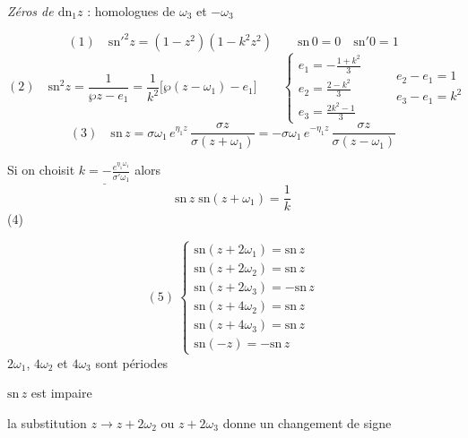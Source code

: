 \documentclass[11pt,a4paper]{article}
\begin{document}
\emph{Zéros de $\mathrm{dn}_1 z$} : homologues de $\omega_3$ et $-\omega_3$
\struck{\ill{}}

\ill{}
\[
(1)\quad \boxed{\mathrm{sn}'^2 z = (1-z^2)(1-k^2z^2)} \qquad
\mathrm{sn}\,0 = 0 \quad \mathrm{sn}'0 = 1
\]
\[
(2)\quad \boxed{\mathrm{sn}^2 z = \frac{1}{\wp z - e_1}
= \frac{1}{k^2}\bigl[\wp(z-\omega_1) - e_1\bigr]}
\qquad
\left\lbrace
\begin{array}{l}
e_1 = -\frac{1+k^2}{3}\\[4pt]
e_2 = \frac{2-k^2}{3}\\[4pt]
e_3 = \frac{2k^2-1}{3}
\end{array}
\right.
\qquad
\begin{array}{l}
e_2 - e_1 = 1\\
e_3 - e_1 = k^2
\end{array}
\]
\[
(3)\quad \boxed{\mathrm{sn}\,z = \sigma\omega_1\,e^{\eta_1 z}\,\frac{\sigma z}{\sigma(z+\omega_1)}
= -\sigma\omega_1\,e^{-\eta_1 z}\,\frac{\sigma z}{\sigma(z-\omega_1)}}
\]

Si on choisit $\underline{k = -\frac{e^{\eta_1\omega_1}}{\sigma'\omega_1}}$
alors
\[
\boxed{\mathrm{sn}\,z\;\mathrm{sn}(z+\omega_1) = \frac{1}{k}}
\]
(4)

\[
(5)\ \left\lbrace
\begin{array}{l}
\mathrm{sn}(z+2\omega_1) = \mathrm{sn}\,z\\
\mathrm{sn}(z+2\omega_2) = \mathrm{sn}\,z\\
\mathrm{sn}(z+2\omega_3) = -\mathrm{sn}\,z\\[4pt]
\mathrm{sn}(z+4\omega_2) = \mathrm{sn}\,z\\
\mathrm{sn}(z+4\omega_3) = \mathrm{sn}\,z\\[4pt]
\mathrm{sn}(-z) = -\mathrm{sn}\,z
\end{array}
\right.
\]
$2\omega_1$, $4\omega_2$ et $4\omega_3$ sont périodes

$\mathrm{sn}\,z$ est impaire

la substitution $z\to z+2\omega_2$ ou $z+2\omega_3$ donne un changement de signe
\end{document}
